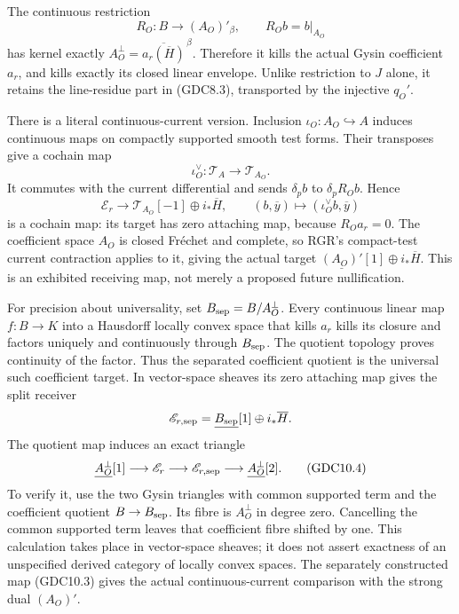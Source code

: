 The continuous restriction \[
R_O:B\longrightarrow(A_O)'_\beta,
\qquad R_Ob=b|_{A_O}
\tag{GDC10.1}
\] has kernel exactly
\(A_O^\perp=\overline{a_r(\overline H)}^{\,\beta}\). Therefore it kills
the actual Gysin coefficient \(a_r\), and kills exactly its closed
linear envelope. Unlike restriction to \(J\) alone, it retains the
line-residue part in (GDC8.3), transported by the injective \(q_O'\).

There is a literal continuous-current version. Inclusion
\(\iota_O:A_O\hookrightarrow A\) induces continuous maps on compactly
supported smooth test forms. Their transposes give a cochain map \[
\iota_O^\vee:\mathscr T_A\longrightarrow\mathscr T_{A_O}.
\tag{GDC10.2}
\] It commutes with the current differential and sends \(\delta_pb\) to
\(\delta_p R_Ob\). Hence \[
\mathscr E_r\longrightarrow
\mathscr T_{A_O}[-1]\oplus i_*\overline H,
\qquad(b,\overline y)\longmapsto(\iota_O^\vee b,\overline y)
\tag{GDC10.3}
\] is a cochain map: its target has zero attaching map, because
\(R_Oa_r=0\). The coefficient space \(A_O\) is closed Fréchet and
complete, so RGR's compact-test current contraction applies to it,
giving the actual target \(\underline{(A_O)'}[1]\oplus i_*\overline H\).
This is an exhibited receiving map, not merely a proposed future
nullification.

For precision about universality, set \(B_{\rm sep}=B/A_O^\perp\). Every
continuous linear map \(f:B\to K\) into a Hausdorff locally convex space
that kills \(a_r\) kills its closure and factors uniquely and
continuously through \(B_{\rm sep}\). The quotient topology proves
continuity of the factor. Thus the separated coefficient quotient is the
universal such coefficient target. In vector-space sheaves its zero
attaching map gives the split receiver \[
\mathscr E_{r,\rm sep}=\underline{B_{\rm sep}}[1]\oplus i_*\overline H.
\] The quotient map induces an exact triangle \[
\underline{A_O^\perp}[1]\longrightarrow\mathscr E_r
\longrightarrow\mathscr E_{r,\rm sep}
\longrightarrow\underline{A_O^\perp}[2].
\tag{GDC10.4}
\] To verify it, use the two Gysin triangles with common supported term
and the coefficient quotient \(B\to B_{\rm sep}\). Its fibre is
\(A_O^\perp\) in degree zero. Cancelling the common supported term
leaves that coefficient fibre shifted by one. This calculation takes
place in vector-space sheaves; it does not assert exactness of an
unspecified derived category of locally convex spaces. The separately
constructed map (GDC10.3) gives the actual continuous-current comparison
with the strong dual \((A_O)'\).

